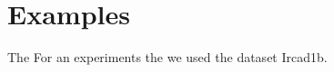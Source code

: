 \section{Examples}\label{sec:examples}


The 
For an experiments the we used the dataset Ircad1b. 

\begin{table}

\end{table}
\begin{table}

\end{table}